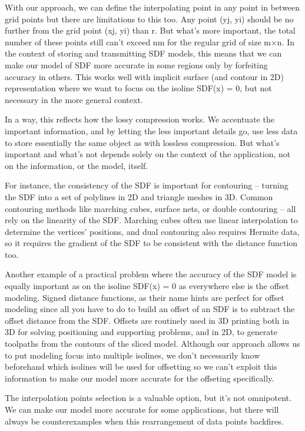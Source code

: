 \documentclass[12pt,a4paper]{article}
\begin{document}
With our approach, we can define the interpolating point in any point in between grid points but there are limitations to this too. Any point (yj, yi) should be no further from the grid point (xj, yi) than r. But what’s more important, the total number of these points still can’t exceed nm for the regular grid of size m×n. In the context of storing and transmitting SDF models, this means that we can make our model of SDF more accurate in some regions only by forfeiting accuracy in others. This works well with implicit surface (and contour in 2D) representation where we want to focus on the isoline SDF(x) = 0, but not necessary in the more general context.
\par
In a way, this reflects how the lossy compression works. We accentuate the important information, and by letting the less important details go, use less data to store essentially the same object as with lossless compression. But what’s important and what’s not depends solely on the context of the application, not on the information, or the model, itself.
\par
For instance, the consistency of the SDF is important for contouring – turning the SDF into a set of polylines in 2D and triangle meshes in 3D. Common contouring methods like marching cubes, surface nets, or double contouring – all rely on the linearity of the SDF. Marching cubes often use linear interpolation to determine the vertices' positions, and dual contouring also requires Hermite data, so it requires the gradient of the SDF to be consistent with the distance function too.
\par
Another example of a practical problem where the accuracy of the SDF model is equally important as on the isoline SDF(x) = 0 as everywhere else is the offset modeling. Signed distance functions, as their name hints are perfect for offset modeling since all you have to do to build an offset of an SDF is to subtract the offset distance from the SDF. Offsets are routinely used in 3D printing both in 3D for solving positioning and supporting problems, and in 2D, to generate toolpaths from the contours of the sliced model. Although our approach allows us to put modeling focus into multiple isolines, we don’t necessarily know beforehand which isolines will be used for offsetting so we can’t exploit this information to make our model more accurate for the offseting specifically.
\par
The interpolation points selection is a valuable option, but it’s not omnipotent. We can make our model more accurate for some applications, but there will always be counterexamples when this rearrangement of data points backfires.
\end{document}
